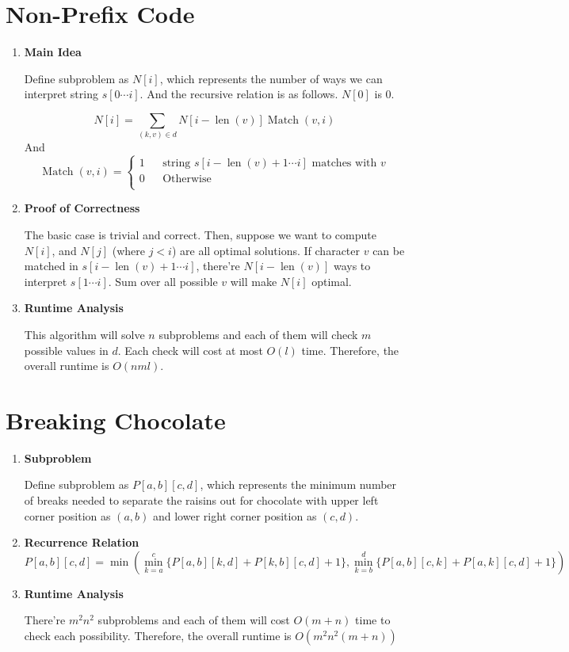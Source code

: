 \documentclass[11pt]{article}
\newenvironment{qparts}{\begin{enumerate}[{(}a{)}]}{\end{enumerate}}
\begin{document}
\section{Non-Prefix Code}
\begin{qparts}
	\item \textbf{Main Idea}
	
	Define subproblem as $N[i]$, which represents the number of ways we can interpret string $s[0 \cdots i]$. And the recursive relation is as follows. $N[0]$ is 0.
	
	\[
		N[i] = \sum_{(k, v) \in d} N[i - \operatorname{len}(v)] \operatorname{Match}(v, i)
	\]
	And
	\[ \operatorname{Match}(v, i) = 
	\left\{
		\begin{array}{rcl}
			1     &      & \text{string } s[i - \operatorname{len}(v) + 1 \cdots i] \text{ matches with } v  \\
			0      &      & \text{Otherwise}  \\
		\end{array}
	\right.
	\]
	\item \textbf{Proof of Correctness}
	
	The basic case is trivial and correct. Then, suppose we want to compute $N[i]$, and $N[j]$ (where $j<i$) are all optimal solutions. If character $v$ can be matched in $s[i - \operatorname{len}(v) + 1 \cdots i]$, there're $N[i - \operatorname{len}(v)]$ ways to interpret $s[1 \cdots i]$. Sum over all possible $v$ will make $N[i]$ optimal.
	
	
	\item \textbf{Runtime Analysis}
	
	This algorithm will solve $n$ subproblems and each of them will check $m$ possible values in $d$. Each check will cost at most $O(l)$ time. Therefore, the overall runtime is $O(nml)$.
	

\end{qparts}




\newpage
\section{Breaking Chocolate}
\begin{qparts}
	\item \textbf{Subproblem}
	
	Define subproblem as $P[a,b][c, d]$, which represents the minimum 	number of breaks needed to separate the raisins out for chocolate with upper left corner position as $(a, b)$ and lower right corner position as $(c, d)$.
	
	\item \textbf{Recurrence Relation}
	\[
		P[a,b][c,d] = \min( \min_{k=a}^{c}\{ P[a, b][k, d] + P[k, b][c, d] + 1 \}, \min_{k=b}^{d}\{ P[a, b][c, k] + P[a, k][c, d] + 1 \})
	\]
	
	\item \textbf{Runtime Analysis}
	
	There're $m^2n^2$ subproblems and each of them will cost $O(m+n)$ time to check each possibility.
	Therefore, the overall runtime is $O(m^2n^2(m+n))$
	

\end{qparts}
\end{document}
